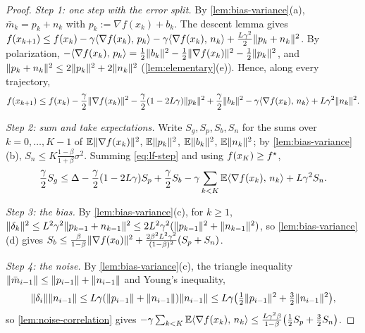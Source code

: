 \begin{proof}
\emph{Step 1: one step with the error split.} By \cref{lem:bias-variance}(a),
$\bar m_k=p_k+n_k$ with $p_k:=\nabla f(x_k)+b_k$. The descent lemma gives
$f(x_{k+1})\le f(x_k)-\gamma\langle \nabla f(x_k),\, p_k\rangle-\gamma\langle \nabla f(x_k),\, n_k\rangle
+\frac{L\gamma^2}{2}\lVert p_k+n_k\rVert^2$. By polarization,
$-\langle \nabla f(x_k),\, p_k\rangle=\frac12\lVert b_k\rVert^2-\frac12\lVert \nabla f(x_k)\rVert^2-\frac12\lVert p_k\rVert^2$, and
$\lVert p_k+n_k\rVert^2\le2\lVert p_k\rVert^2+2\lVert n_k\rVert^2$ (\cref{lem:elementary}(e)). Hence, along every
trajectory,
\begin{equation}\label{eq:lf-step}
  f(x_{k+1})\le f(x_k)-\frac\gamma2\lVert \nabla f(x_k)\rVert^2-\frac\gamma2(1-2L\gamma)\lVert p_k\rVert^2
  +\frac\gamma2\lVert b_k\rVert^2-\gamma\langle \nabla f(x_k),\, n_k\rangle+L\gamma^2\lVert n_k\rVert^2 .
\end{equation}

\emph{Step 2: sum and take expectations.} Write $S_g,S_p,S_b,S_n$ for the sums over
$k=0,\dots,K-1$ of $\mathbb{E}\lVert \nabla f(x_k)\rVert^2$, $\mathbb{E}\lVert p_k\rVert^2$, $\mathbb{E}\lVert b_k\rVert^2$, $\mathbb{E}\lVert n_k\rVert^2$; by
\cref{lem:bias-variance}(b), $S_n\le K\frac{1-\beta}{1+\beta}\sigma^2$. Summing \eqref{eq:lf-step}
and using $f(x_K)\ge f^\star$,
\begin{equation}\label{eq:lf-sum}
  \frac\gamma2S_g\le\Delta-\frac\gamma2(1-2L\gamma)S_p+\frac\gamma2S_b
  -\gamma\sum_{k<K}\mathbb{E}\langle \nabla f(x_k),\, n_k\rangle+L\gamma^2S_n .
\end{equation}

\emph{Step 3: the bias.} By \cref{lem:bias-variance}(c), for $k\ge1$,
$\lVert \delta_k\rVert^2\le L^2\gamma^2\lVert p_{k-1}+n_{k-1}\rVert^2\le2L^2\gamma^2(\lVert p_{k-1}\rVert^2+\lVert n_{k-1}\rVert^2)$, so
\cref{lem:bias-variance}(d) gives
$S_b\le\frac{\beta}{1-\beta}\lVert \nabla f(x_0)\rVert^2+\frac{2\beta^2L^2\gamma^2}{(1-\beta)^2}(S_p+S_n)$.

\emph{Step 4: the noise.} By \cref{lem:bias-variance}(c), the triangle inequality
$\lVert \bar m_{i-1}\rVert\le\lVert p_{i-1}\rVert+\lVert n_{i-1}\rVert$ and Young's inequality,
\[
  \lVert \delta_i\rVert\lVert n_{i-1}\rVert\le L\gamma(\lVert p_{i-1}\rVert+\lVert n_{i-1}\rVert)\lVert n_{i-1}\rVert
  \le L\gamma\bigl(\tfrac12\lVert p_{i-1}\rVert^2+\tfrac32\lVert n_{i-1}\rVert^2\bigr),
\]
so \cref{lem:noise-correlation} gives
$-\gamma\sum_{k<K}\mathbb{E}\langle \nabla f(x_k),\, n_k\rangle\le\frac{L\gamma^2\beta}{1-\beta}\bigl(\frac12S_p+\frac32S_n\bigr)$.


\end{proof}

